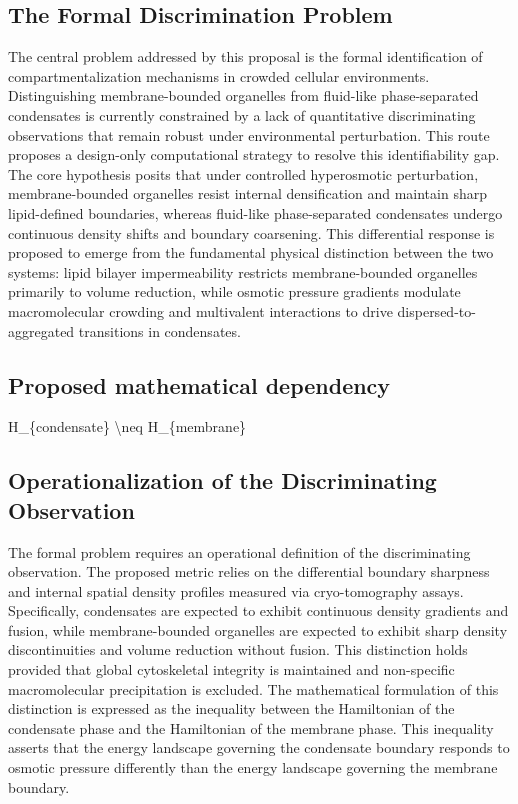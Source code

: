 \documentclass[conference]{IEEEtran}
\begin{document}
\subsection{The Formal Discrimination Problem}
The central problem addressed by this proposal is the formal identification of compartmentalization mechanisms in crowded cellular environments. Distinguishing membrane-bounded organelles from fluid-like phase-separated condensates is currently constrained by a lack of quantitative discriminating observations that remain robust under environmental perturbation. This route proposes a design-only computational strategy to resolve this identifiability gap. The core hypothesis posits that under controlled hyperosmotic perturbation, membrane-bounded organelles resist internal densification and maintain sharp lipid-defined boundaries, whereas fluid-like phase-separated condensates undergo continuous density shifts and boundary coarsening. This differential response is proposed to emerge from the fundamental physical distinction between the two systems: lipid bilayer impermeability restricts membrane-bounded organelles primarily to volume reduction, while osmotic pressure gradients modulate macromolecular crowding and multivalent interactions to drive dispersed-to-aggregated transitions in condensates.~\cite{cite_42ed299a53990c06,cite_7161cfcb40366dd0,cite_81a08c2c7b9c90d0}

\subsection{Proposed mathematical dependency}
H\_\{condensate\} \textbackslash{}neq H\_\{membrane\}~\cite{cite_7161cfcb40366dd0,cite_81a08c2c7b9c90d0}

\subsection{Operationalization of the Discriminating Observation}
The formal problem requires an operational definition of the discriminating observation. The proposed metric relies on the differential boundary sharpness and internal spatial density profiles measured via cryo-tomography assays. Specifically, condensates are expected to exhibit continuous density gradients and fusion, while membrane-bounded organelles are expected to exhibit sharp density discontinuities and volume reduction without fusion. This distinction holds provided that global cytoskeletal integrity is maintained and non-specific macromolecular precipitation is excluded. The mathematical formulation of this distinction is expressed as the inequality between the Hamiltonian of the condensate phase and the Hamiltonian of the membrane phase. This inequality asserts that the energy landscape governing the condensate boundary responds to osmotic pressure differently than the energy landscape governing the membrane boundary.~\cite{cite_7161cfcb40366dd0,cite_8d46403814b99258}
\end{document}
